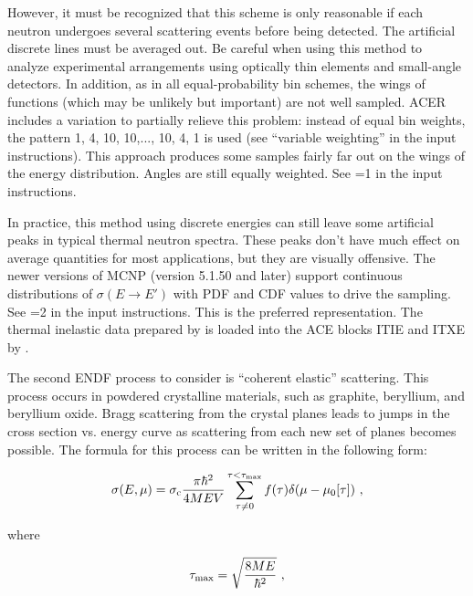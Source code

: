 However, it must be recognized that this scheme is only reasonable
if each neutron undergoes several scattering events before being
detected.  The artificial discrete lines must be averaged out.  Be
careful when using this method to analyze experimental arrangements
using optically thin elements and small-angle detectors.  In addition,
as in all equal-probability bin schemes, the wings of functions
(which may be unlikely but important) are not well sampled.  ACER
includes a variation to partially relieve this problem: instead of
equal bin weights, the pattern 1, 4, 10, 10,..., 10, 4, 1 is used
(see ``variable weighting'' in the input instructions).  This approach
produces some samples fairly far out on the wings of the energy
distribution.  Angles are still equally weighted.  See =1
in the input instructions.

In practice, this method using discrete energies can still leave
some artificial peaks in typical thermal neutron spectra.  These
peaks don't have much effect on average quantities for most
applications, but they are visually offensive.  The newer versions
of MCNP (version 5.1.50 and later) support continuous distributions
of $\sigma(E\rightarrow E')$ with PDF and CDF values to drive the
sampling.  See =2 in the input instructions.  This is
the preferred representation.  The thermal inelastic data prepared by
 is loaded into the ACE blocks
ITIE and ITXE by .

The second ENDF process to consider is ``coherent elastic'' scattering.
 This process occurs in powdered crystalline
materials, such as graphite, beryllium, and beryllium oxide.  Bragg
scattering from the crystal planes leads to jumps in the cross
section vs. energy curve as scattering from each
new set of planes becomes possible.  The formula for this process can
be written in the following form:

\begin{equation}
   \sigma(E,\mu)=\sigma_{\rm c}
    \frac{\pi\hbar^2}{4MEV}
     \sum_{\tau\ne 0}^{\tau<\tau_{\rm max}}
      f(\tau)\delta(\mu-\mu_0[\tau])\,\,,
\end{equation}

\noindent
where

\begin{equation}
   \tau_{\rm max}=\sqrt{\frac{8ME}{\hbar^2}}\,\,,
\end{equation}

